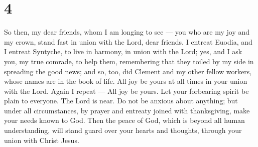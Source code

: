 \hypertarget{section-3}{%
\section{4}\label{section-3}}

 So then, my dear friends, whom I am longing to see --- you
who are my joy and my crown, stand fast in union with the Lord, dear
friends.  I entreat Euodia, and I entreat Syntyche, to live
in harmony, in union with the Lord;  yes, and I ask you, my
true comrade, to help them, remembering that they toiled by my side in
spreading the good news; and so, too, did Clement and my other fellow
workers, whose names are in the book of life.  All joy be
yours at all times in your union with the Lord. Again I repeat --- All
joy be yours.  Let your forbearing spirit be plain to
everyone. The Lord is near.  Do not be anxious about
anything; but under all circumstances, by prayer and entreaty joined
with thanksgiving, make your needs known to God.  Then the
peace of God, which is beyond all human understanding, will stand guard
over your hearts and thoughts, through your union with Christ Jesus.

